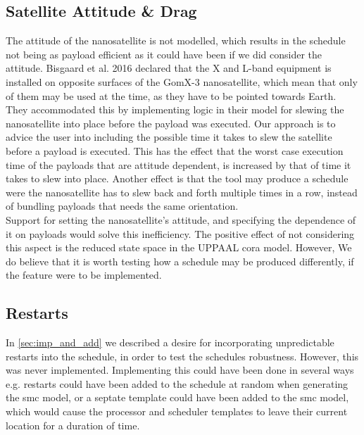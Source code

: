 \subsection*{Satellite Attitude \& Drag}
The attitude of the nanosatellite is not modelled, which results in the schedule not being as payload efficient as it could have been if we did consider the attitude. Bisgaard et al. 2016\cite{gomx3} declared that the X and L-band equipment is installed on opposite surfaces of the GomX-3 nanosatellite, which mean that only of them may be used at the time, as they have to be pointed towards Earth. They accommodated this by implementing logic in their model for slewing the nanosatellite into place before the payload was executed. Our approach is to advice the user into including the possible time it takes to slew the satellite before a payload is executed. This has the effect that the worst case execution time of the payloads that are attitude dependent, is increased by that of time it takes to slew into place. Another effect is that the tool may produce a schedule were the nanosatellite has to slew back and forth multiple times in a row, instead of bundling payloads that needs the same orientation.\\
Support for setting the nanosatellite's attitude, and specifying the dependence of it on payloads would solve this inefficiency.
The positive effect of not considering this aspect is the reduced state space in the UPPAAL \gls{cora} model. However, We do believe that it is worth testing how a schedule may be produced differently, if the feature were to be implemented.

\subsection*{Restarts}
In \cref{sec:imp_and_add} we described a desire for incorporating unpredictable restarts into the schedule, in order to test the schedules robustness. However, this was never implemented. Implementing this could have been done in several ways e.g. restarts could have been added to the schedule at random when generating the \gls{smc} model, or a septate template could have been added to the \gls{smc} model, which would cause the processor and scheduler templates to leave their current location for a duration of time.

